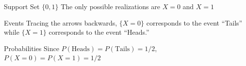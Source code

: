 \documentclass[handout]{beamer}
\begin{document}
\begin{frame}
\small
\begin{figure}
\centering
{}
\end{figure}
 
\begin{block}{Support Set $\{0,1\}$}
The only possible realizations are $X=0$ and $X=1$
\end{block}
 
\begin{block}{Events}
Tracing the arrows backwards, $\{X=0\}$ corresponds to the event ``Tails'' while $\{X=1\}$ corresponds to the event ``Heads.''
\end{block}
 
\begin{block}{Probabilities}
Since $P(\mbox{Heads}) = P(\mbox{Tails}) = 1/2$, $P(X=0) = P(X=1) = 1/2$
\end{block}

\end{frame}
\end{document}

